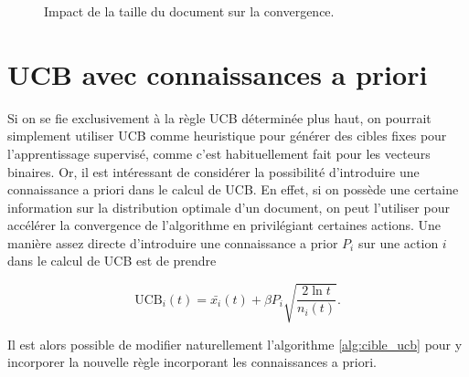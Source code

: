 \begin{figure}[h!]
    \caption{Impact de la taille du document sur la convergence.}
    \label{fig:bandit_combi_doc_len}
\end{figure}

\section{UCB avec connaissances a priori}

Si on se fie exclusivement à la règle UCB déterminée plus haut, on pourrait simplement
utiliser UCB comme heuristique pour générer des cibles fixes pour l'apprentissage
supervisé, comme c'est habituellement fait pour les vecteurs binaires.
Or, il est intéressant de considérer la possibilité d'introduire une connaissance a priori
dans le calcul de UCB.
En effet, si on possède une certaine information sur la distribution optimale d'un
document, on peut l'utiliser pour accélérer la convergence de l'algorithme en privilégiant
certaines actions.
Une manière assez directe d'introduire une connaissance a prior $P_i$ sur une action
$i$ dans le calcul de UCB est de prendre

\begin{equation}
    \text{UCB}_i(t) = \bar{x_i}(t) + \beta P_i \sqrt{\frac{2\ln t}{n_i(t)}}.
\end{equation}

Il est alors possible de modifier naturellement l'algorithme \ref{alg:cible_ucb} pour y
incorporer la nouvelle règle incorporant les connaissances a priori.

